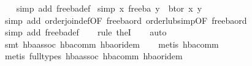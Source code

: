 \begin{isabellebody}
%
\isadelimproof
\ \ %
\endisadelimproof
%
\isatagproof
{}\isamarkupfalse%
\ {}simp\ add{}\ free{}ba{}def{}%
\endisatagproof
{\isafoldproof}%
%
\isadelimproof
\isanewline
%
\endisadelimproof
\isanewline
{}\isamarkupfalse%
\ {}simp{}{}\ {}x\ {}\isactrlbsub free{}ba\isactrlesub \ y\ {}\ bt{}or\ x\ y{}\isanewline
%
\isadelimproof
\ \ %
\endisadelimproof
%
\isatagproof
{}\isamarkupfalse%
\ {}simp\ add{}\ order{}join{}def{}OF\ free{}ba{}ord{}\ order{}lub{}simp{}OF\ free{}ba{}ord{}{}\isanewline
\ \ \isamarkupfalse%
\ {}simp\ add{}\ free{}ba{}def{}\isanewline
\ \ \isamarkupfalse%
\ {}rule\ the{}I{}{}\isanewline
\ \ \isamarkupfalse%
\ auto\isanewline
\ \ \isamarkupfalse%
\ {}smt\ hba{}assoc\ hba{}comm\ hba{}or{}idem{}\isanewline
\ \ \isamarkupfalse%
\ {}metis\ hba{}comm{}\isanewline
\ \ \isamarkupfalse%
\ {}metis\ {}full{}types{}\ hba{}assoc\ hba{}comm\ hba{}or{}idem{}%

\end{isabellebody}

